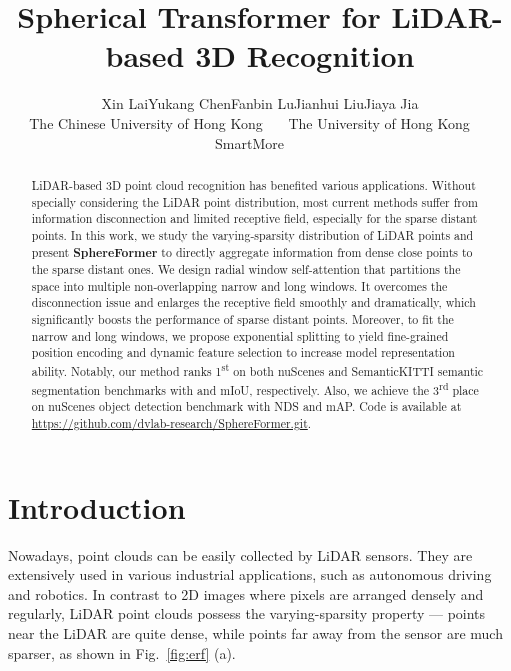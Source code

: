\documentclass[10pt,twocolumn,letterpaper]{article}
\begin{document}
\title{Spherical Transformer for LiDAR-based 3D Recognition}

\author{Xin Lai\hspace{1.0cm}Yukang Chen\hspace{1.0cm}Fanbin Lu\hspace{1.0cm}Jianhui Liu\hspace{1.0cm}Jiaya Jia\\
The Chinese University of Hong Kong~~~
The University of Hong Kong~~~
SmartMore~~~
}

\maketitle

\begin{abstract}
LiDAR-based 3D point cloud recognition has benefited various applications. Without specially considering the LiDAR point distribution, most current methods suffer from information disconnection and limited receptive field, especially for the sparse distant points. In this work, we study the varying-sparsity distribution of LiDAR points and present \textbf{SphereFormer} to directly aggregate information from dense close points to the sparse distant ones. We design radial window self-attention that partitions the space into multiple non-overlapping narrow and long windows. It overcomes the disconnection issue and enlarges the receptive field smoothly and dramatically, which significantly boosts the performance of sparse distant points. Moreover, to fit the narrow and long windows, we propose exponential splitting to yield fine-grained position encoding and dynamic feature selection to increase model representation ability. Notably, our method ranks 1\textsuperscript{st} on both nuScenes and SemanticKITTI semantic segmentation benchmarks with  and  mIoU, respectively. Also, we achieve the 3\textsuperscript{rd} place on nuScenes object detection benchmark with  NDS and  mAP. Code is available at \url{https://github.com/dvlab-research/SphereFormer.git}.
\end{abstract}

\section{Introduction}
\label{sec:intro}

Nowadays, point clouds can be easily collected by LiDAR sensors. They are extensively used in various industrial applications, such as autonomous driving and robotics. In contrast to 2D images where pixels are arranged densely and regularly, LiDAR point clouds possess the varying-sparsity property --- points near the LiDAR are quite dense, while points far away from the sensor are much sparser, as shown in Fig.~\ref{fig:erf} (a).
\end{document}
